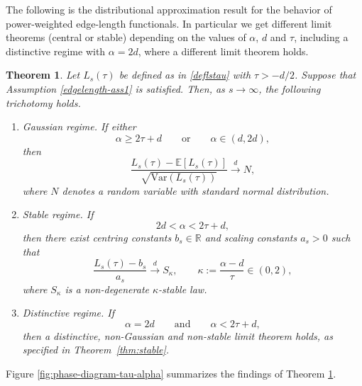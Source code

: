 \documentclass{article}
\newtheorem{theorem}{Theorem}[section]
\theoremstyle{definition}
\numberwithin{equation}{section}
\theoremstyle{remark}
\newcommand{\E}{\mathbb{E}}
\newcommand{\Var}{\mathrm{Var}}
\begin{document}


The following is the distributional approximation result for the behavior of power-weighted edge-length functionals. In particular we get different limit theorems (central or stable) depending on the values of $\alpha$, $d$ and $\tau$, including a distinctive regime with $\alpha =2d$, where a different limit theorem holds.

\begin{theorem}\label{mainsumedges}
    Let $L_s (\tau)$ be defined as in \eqref{deflstau} with $\tau>-d/2$. Suppose that Assumption \ref{edgelength-ass1} is satisfied. Then, as $s\to\infty$, the following trichotomy holds.

\begin{enumerate}[label=\textup{(\roman*)},leftmargin=2.2em]
\item {Gaussian regime.}
If either
\[
\alpha \ge 2\tau+d
\qquad\text{or}\qquad
\alpha\in(d,2d),
\]
then
\[
\frac{L_s(\tau)-\E[L_s(\tau)]}{\sqrt{\Var(L_s(\tau))}}
\overset{d}{\longrightarrow} N,
\]
where $N$ denotes a random variable with standard normal distribution.
\item {Stable regime.}
If
\[
2d<\alpha<2\tau+d,
\]
then there exist centring constants $b_s\in\mathbb{R}$ and scaling constants $a_s>0$ such that
\[
\frac{L_s(\tau)-b_s}{a_s}
\overset{d}{\longrightarrow} S_{\kappa},
\qquad
\kappa:=\frac{\alpha-d}{\tau}\in(0,2),
\]
where $S_{\kappa}$ is a non-degenerate $\kappa$-stable law.

\item {Distinctive regime.}
If
\[
\alpha=2d
\qquad\text{and}\qquad
\alpha<2\tau+d,
\]
then a distinctive, non-Gaussian and non-stable limit theorem holds, as specified in
Theorem~\ref{thm:stable}.
\end{enumerate}
\end{theorem}

Figure \ref{fig:phase-diagram-tau-alpha} summarizes the findings of Theorem \ref{mainsumedges}.
\end{document}
